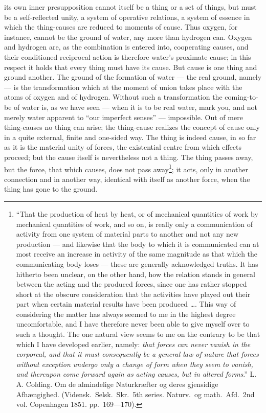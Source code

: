 \documentclass[12pt,a4paper]{book}
\begin{document}
its own inner presupposition cannot itself be a thing or a set of things, but
must be a self-reflected unity, a system of operative relations, a system of
essence in which the thing-causes are reduced to moments of cause. Thus oxygen,
for instance, cannot be the ground of water, any more than hydrogen can. Oxygen
and hydrogen are, as the combination is entered into, cooperating causes, and
their conditioned reciprocal action is therefore water's proximate cause; in
this respect it holds that every thing must have its cause. But cause is one
thing and ground another. The ground of the formation of water --- the real
ground, namely --- is the transformation which at the moment of union takes
place with the atoms of oxygen and of hydrogen. Without such a transformation
the coming-to-be of water is, as we have seen --- when it is to be real water,
mark you, and not merely water apparent to ``our imperfect senses'' ---
\setcounter{footnote}{0}
impossible. Out of mere thing-causes no thing can arise; the thing-cause
realizes the concept of cause only in a quite external, finite and one-sided
way. The thing is indeed cause, in so far as it is the material unity of
forces, the existential centre from which effects proceed; but the cause itself
is nevertheless not a thing. The thing passes away, but the force, that which
causes, does not pass away\footnote{``That the production of heat by heat, or
of mechanical quantities of work by mechanical quantities of work, and so on,
is really only a communication of activity from one system of material parts to
another and not any new production --- and likewise that the body to which it
is communicated can at most receive an increase in activity of the same
magnitude as that which the communicating body loses --- these are generally
acknowledged truths. It has hitherto been unclear, on the other hand, how the
relation stands in general between the acting and the produced forces, since
one has rather stopped short at the obscure consideration that the activities
have played out their part when certain material results have been produced
\ldots. This way of considering the matter has always seemed to me in the
highest degree uncomfortable, and I have therefore never been able to give
myself over to such a thought. The one natural view seems to me on the contrary
to be that which I have developed earlier, namely: \emph{that forces can never
vanish in the corporeal, and that it must consequently be a general law of
nature that forces without exception undergo only a change of form when they
seem to vanish, and thereupon come forward again as acting causes, but in
altered forms}.'' L. A. Colding. Om de almindelige Naturkræfter og deres
gjensidige Afhængighed. (Vidensk.\ Selsk.\ Skr.\ 5th series. Naturv.\ og math.\
Afd.\ 2nd vol. Copenhagen 1851. pp.~169---170).}; it acts, only in another
connection and in another way, identical with itself as another force, when the
thing has gone to the ground.
\end{document}
